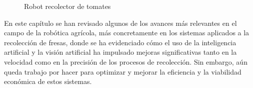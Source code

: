 
\begin{figure}[H]
    \begin{center}
      \subcapcentertrue
      \hspace{2mm}
    \end{center}
    \caption{Robot recolector de tomates}
    \label{fig:Robots_tomates}
\end{figure}

\vspace{2cm}

En este capítulo se han revisado algunos de los avances más relevantes en el campo de la robótica agrícola, más concretamente en los sistemas aplicados a la recolección de fresas, donde se ha evidenciado cómo el uso de la inteligencia artificial y la visión artificial ha impulsado mejoras significativas tanto en la velocidad como en la precisión de los procesos de recolección. Sin embargo, aún queda trabajo por hacer para optimizar y mejorar la eficiencia y la viabilidad económica de estos sistemas.\\

